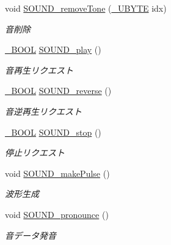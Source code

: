 \begin{DoxyCompactItemize}
void \hyperlink{sound_8h_a89125a6dfb8c0023aba543f2d0f24a8f_a89125a6dfb8c0023aba543f2d0f24a8f}{S\+O\+U\+N\+D\+\_\+remove\+Tone} (\hyperlink{stddef_8h_aac464b47452ce9406f88ef194e2becc1_aac464b47452ce9406f88ef194e2becc1}{\+\_\+\+U\+B\+Y\+T\+E} idx)
\begin{DoxyCompactList}\small\item\em 音削除 \end{DoxyCompactList}\item 
\hyperlink{stddef_8h_afbf708854fe02af8475a9ba02f3196cb_afbf708854fe02af8475a9ba02f3196cb}{\+\_\+\+B\+O\+O\+L} \hyperlink{sound_8h_a7ab16e900aec03cfe3707d0f33e5821c_a7ab16e900aec03cfe3707d0f33e5821c}{S\+O\+U\+N\+D\+\_\+play} ()
\begin{DoxyCompactList}\small\item\em 音再生リクエスト \end{DoxyCompactList}\item 
\hyperlink{stddef_8h_afbf708854fe02af8475a9ba02f3196cb_afbf708854fe02af8475a9ba02f3196cb}{\+\_\+\+B\+O\+O\+L} \hyperlink{sound_8h_aafc9cb1cbfabe6eced6a250c99cd1de0_aafc9cb1cbfabe6eced6a250c99cd1de0}{S\+O\+U\+N\+D\+\_\+reverse} ()
\begin{DoxyCompactList}\small\item\em 音逆再生リクエスト \end{DoxyCompactList}\item 
\hyperlink{stddef_8h_afbf708854fe02af8475a9ba02f3196cb_afbf708854fe02af8475a9ba02f3196cb}{\+\_\+\+B\+O\+O\+L} \hyperlink{sound_8h_a1504a4f21c440a59edeecd944b01c032_a1504a4f21c440a59edeecd944b01c032}{S\+O\+U\+N\+D\+\_\+stop} ()
\begin{DoxyCompactList}\small\item\em 停止リクエスト \end{DoxyCompactList}\item 
void \hyperlink{sound_8h_a5fc67e86da09d64eef5060e3393395b0_a5fc67e86da09d64eef5060e3393395b0}{S\+O\+U\+N\+D\+\_\+make\+Pulse} ()
\begin{DoxyCompactList}\small\item\em 波形生成 \end{DoxyCompactList}\item 
void \hyperlink{sound_8h_ac55bd0188c9aed90f2f859f1ac03ed61_ac55bd0188c9aed90f2f859f1ac03ed61}{S\+O\+U\+N\+D\+\_\+pronounce} ()
\begin{DoxyCompactList}\small\item\em 音データ発音 \end{DoxyCompactList}\end{DoxyCompactItemize}
